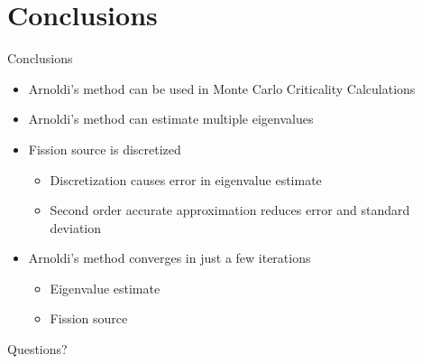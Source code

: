 \documentclass[xcolor={usenames, dvipsnames},]{beamer}
\begin{document}
\section{Conclusions}
\begin{frame}{Conclusions}
    \begin{itemize}[<+->]
        \item Arnoldi's method can be used in Monte Carlo Criticality Calculations
        \item Arnoldi's method can estimate multiple eigenvalues
        \item Fission source is discretized
        \begin{itemize}[<.->]
            \item Discretization causes error in eigenvalue estimate
            \item Second order accurate approximation reduces error and standard deviation
        \end{itemize}
        \item Arnoldi's method converges in just a few iterations
        \begin{itemize}[<.->]
            \item Eigenvalue estimate
            \item Fission source
        \end{itemize}
    \end{itemize}
\end{frame}

\begin{frame}{}
    \begin{center}
        \Huge{Questions?}
    \end{center}
\end{frame}
\end{document}

